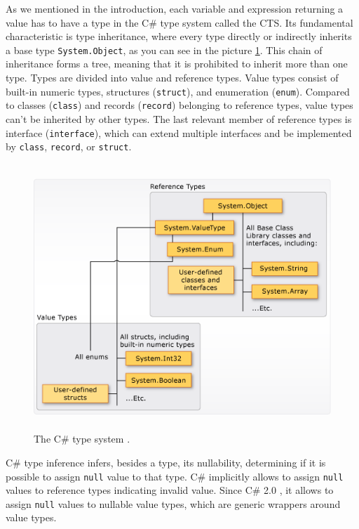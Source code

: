 As we mentioned in the introduction, each variable and expression returning a value has to have a type in the C\# type system \cite{online:cSharpTypeSystem} called the \ac{CTS}.
Its fundamental characteristic is type inheritance, where every type directly or indirectly inherits a base type \texttt{System.Object}, as you can see in the picture \ref{img04:typeSys}.
This chain of inheritance forms a tree, meaning that it is prohibited to inherit more than one type.
Types are divided into value and reference types.
Value types consist of built-in numeric types, structures (\texttt{struct}), and enumeration (\texttt{enum}).
Compared to classes (\texttt{class}) and records (\texttt{record}) belonging to reference types, value types can't be inherited by other types.
The last relevant member of reference types is interface (\texttt{interface}), which can extend multiple interfaces and be implemented by \texttt{class}, \texttt{record}, or \texttt{struct}.
\par
\begin{figure}[b!]
\centering
\includegraphics[width=140mm, height=100mm]{../img/value-reference-types-common-type-system.png}
\caption{The C\# type system \cite{online:cSharpTypeSystem}.}
\label{img04:typeSys}
\end{figure}
\par
{}
C\# type inference infers, besides a type, its nullability, determining if it is possible to assign \texttt{null} value to that type.
C\# implicitly allows to assign \texttt{null} values to reference types indicating invalid value.
Since C\# 2.0 \cite{online:csHist}, it allows to assign \texttt{null} values to nullable value types, which are generic wrappers around value types.
